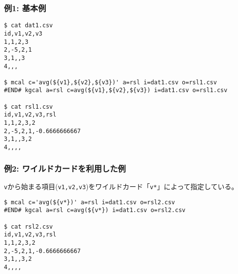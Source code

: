 
\subsubsection*{例1: 基本例}


\begin{Verbatim}[baselinestretch=0.7,frame=single]
$ cat dat1.csv
id,v1,v2,v3
1,1,2,3
2,-5,2,1
3,1,,3
4,,,

$ mcal c='avg(${v1},${v2},${v3})' a=rsl i=dat1.csv o=rsl1.csv
#END# kgcal a=rsl c=avg(${v1},${v2},${v3}) i=dat1.csv o=rsl1.csv

$ cat rsl1.csv
id,v1,v2,v3,rsl
1,1,2,3,2
2,-5,2,1,-0.6666666667
3,1,,3,2
4,,,,
\end{Verbatim}

\subsubsection*{例2: ワイルドカードを利用した例}

\verb|v|から始まる項目(\verb|v1,v2,v3|)をワイルドカード「\verb|v*|」によって指定している。

\begin{Verbatim}[baselinestretch=0.7,frame=single]
$ mcal c='avg(${v*})' a=rsl i=dat1.csv o=rsl2.csv
#END# kgcal a=rsl c=avg(${v*}) i=dat1.csv o=rsl2.csv

$ cat rsl2.csv
id,v1,v2,v3,rsl
1,1,2,3,2
2,-5,2,1,-0.6666666667
3,1,,3,2
4,,,,
\end{Verbatim}
